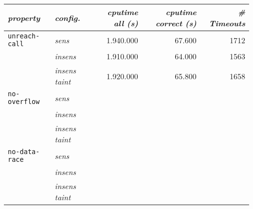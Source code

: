       \begin{tabular}{l|l||r|r|r}
        \textit{property} & \textit{config.} & \textit{cputime all (s)} & \textit{cputime correct (s)} & \textit{\# Timeouts}\\
        \hline
        \texttt{unreach-call} & \textit{sens} & 1.940.000 & 67.600 & 1712 \\
        & \textit{insens} & 1.910.000 & 64.000 & 1563 \\
        & \textit{insens taint} & 1.920.000 & 65.800 & 1658 \\
        \hline
        \texttt{no-overflow} & \textit{sens} & & & \\
        & \textit{insens} & & & \\
        & \textit{insens taint} & & & \\
        \hline
        \texttt{no-data-race} & \textit{sens} & & & \\
        & \textit{insens} & & & \\
        & \textit{insens taint} & & & \\
        \hline
      \end{tabular}

